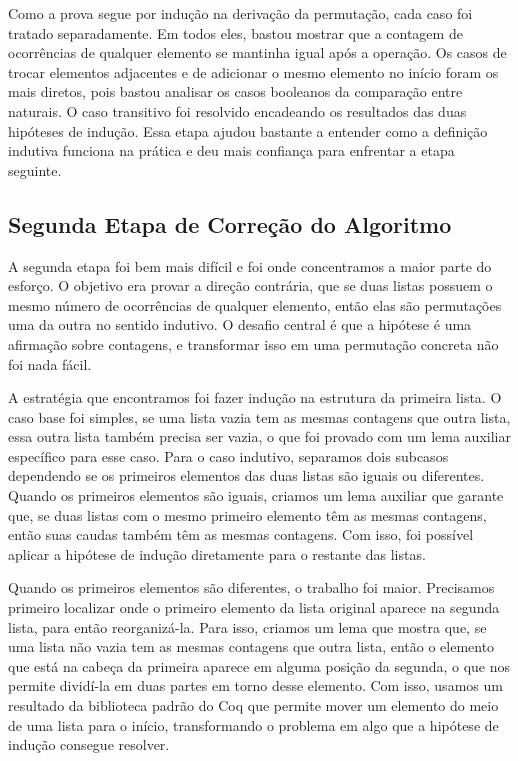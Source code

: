 \documentclass[twocolumn]{article}
\begin{document}
Como a prova segue por indução na derivação da permutação, cada caso foi tratado separadamente. Em todos eles, bastou mostrar que a contagem de ocorrências de qualquer elemento se mantinha igual após a operação. Os casos de trocar elementos adjacentes e de adicionar o mesmo elemento no início foram os mais diretos, pois bastou analisar os casos booleanos da comparação entre naturais. O caso transitivo foi resolvido encadeando os resultados das duas hipóteses de indução. Essa etapa ajudou bastante a entender como a definição indutiva funciona na prática e deu mais confiança para enfrentar a etapa seguinte.

\subsection{Segunda Etapa de Correção do Algoritmo}
A segunda etapa foi bem mais difícil e foi onde concentramos a maior parte do esforço. O objetivo era provar a direção contrária, que se duas listas possuem o mesmo número de ocorrências de qualquer elemento, então elas são permutações uma da outra no sentido indutivo. O desafio central é que a hipótese é uma afirmação sobre contagens, e transformar isso em uma permutação concreta não foi nada fácil.

A estratégia que encontramos foi fazer indução na estrutura da primeira lista. O caso base foi simples, se uma lista vazia tem as mesmas contagens que outra lista, essa outra lista também precisa ser vazia, o que foi provado com um lema auxiliar específico para esse caso. Para o caso indutivo, separamos dois subcasos dependendo se os primeiros elementos das duas listas são iguais ou diferentes.
Quando os primeiros elementos são iguais, criamos um lema auxiliar que garante que, se duas listas com o mesmo primeiro elemento têm as mesmas contagens, então suas caudas também têm as mesmas contagens. Com isso, foi possível aplicar a hipótese de indução diretamente para o restante das listas.

Quando os primeiros elementos são diferentes, o trabalho foi maior. Precisamos primeiro localizar onde o primeiro elemento da lista original aparece na segunda lista, para então reorganizá-la. Para isso, criamos um lema que mostra que, se uma lista não vazia tem as mesmas contagens que outra lista, então o elemento que está na cabeça da primeira aparece em alguma posição da segunda, o que nos permite dividí-la em duas partes em torno desse elemento. Com isso, usamos um resultado da biblioteca padrão do Coq que permite mover um elemento do meio de uma lista para o início, transformando o problema em algo que a hipótese de indução consegue resolver.
\end{document}
